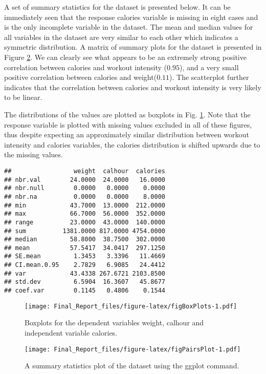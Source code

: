 \documentclass[]{article}
\theoremstyle{definition}
\theoremstyle{definition}
\theoremstyle{definition}
\theoremstyle{remark}
\begin{document}
A set of summary statistics for the dataset is presented below. It can
be immediately seen that the response calories variable is missing in
eight cases and is the only incomplete variable in the dataset. The mean
and median values for all variables in the dataset are very similar to
each other which indicates a symmetric distribution. A matrix of summary
plots for the dataset is presented in Figure \ref{fig:PairsPlot}. We can
clearly see what appears to be an extremely strong positive correlation
between calories and workout intensity (\(0.95\)), and a very small
positive correlation between calories and weight(\(0.11\)). The
scatterplot further indicates that the correlation between calories and
workout intensity is very likely to be linear.

The distributions of the values are plotted as boxplots in Fig.
\ref{fig:muscledataboxplots}. Note that the response variable is plotted
with missing values excluded in all of these figures, thus despite
expecting an approximately similar distribution between workout
intensity and calories variables, the calories distribution is shifted
upwards due to the missing values.

\begin{verbatim}
##                 weight  calhour  calories
## nbr.val        24.0000  24.0000   16.0000
## nbr.null        0.0000   0.0000    0.0000
## nbr.na          0.0000   0.0000    8.0000
## min            43.7000  13.0000  212.0000
## max            66.7000  56.0000  352.0000
## range          23.0000  43.0000  140.0000
## sum          1381.0000 817.0000 4754.0000
## median         58.8000  38.7500  302.0000
## mean           57.5417  34.0417  297.1250
## SE.mean         1.3453   3.3396   11.4669
## CI.mean.0.95    2.7829   6.9085   24.4412
## var            43.4338 267.6721 2103.8500
## std.dev         6.5904  16.3607   45.8677
## coef.var        0.1145   0.4806    0.1544
\end{verbatim}

\begin{figure}[htbp]
\centering
\texttt{[image: Final\_Report\_files/figure-latex/figBoxPlots-1.pdf]}
\caption{\label{fig:figBoxPlots}\label{fig:muscledataboxplots}Boxplots for
the dependent variables weight, calhour and independent variable
calories.}
\end{figure}

\begin{figure}[htbp]
\centering
\texttt{[image: Final\_Report\_files/figure-latex/figPairsPlot-1.pdf]}
\caption{\label{fig:figPairsPlot}\label{fig:PairsPlot}A summary statistics
plot of the dataset using the ggplot command.}
\end{figure}
\end{document}
